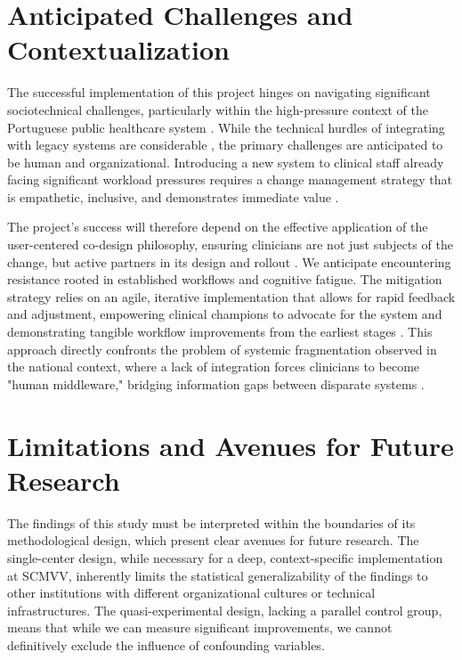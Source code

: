 \section{Anticipated Challenges and Contextualization}

The successful implementation of this project hinges on navigating significant sociotechnical challenges, particularly within the high-pressure context of the Portuguese public healthcare system \cite{goiana2024portuguese}. While the technical hurdles of integrating with legacy systems are considerable \cite{keasberry2017}, the primary challenges are anticipated to be human and organizational. Introducing a new system to clinical staff already facing significant workload pressures requires a change management strategy that is empathetic, inclusive, and demonstrates immediate value \cite{rogers2003}.

The project's success will therefore depend on the effective application of the user-centered co-design philosophy, ensuring clinicians are not just subjects of the change, but active partners in its design and rollout \cite{venkatesh2003}. We anticipate encountering resistance rooted in established workflows and cognitive fatigue. The mitigation strategy relies on an agile, iterative implementation that allows for rapid feedback and adjustment, empowering clinical champions to advocate for the system and demonstrating tangible workflow improvements from the earliest stages \cite{may2013}. This approach directly confronts the problem of systemic fragmentation observed in the national context, where a lack of integration forces clinicians to become "human middleware," bridging information gaps between disparate systems \cite{pinto2016identification}.

\section{Limitations and Avenues for Future Research}

The findings of this study must be interpreted within the boundaries of its methodological design, which present clear avenues for future research. The single-center design, while necessary for a deep, context-specific implementation at SCMVV, inherently limits the statistical generalizability of the findings to other institutions with different organizational cultures or technical infrastructures. The quasi-experimental design, lacking a parallel control group, means that while we can measure significant improvements, we cannot definitively exclude the influence of confounding variables.

